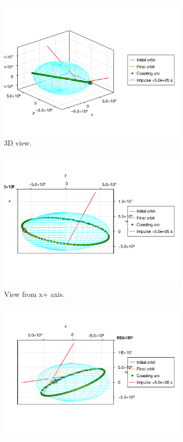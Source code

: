 \begin{figure}[htbp]
    \centering
    \begin{subfigure}{0.49\linewidth}
        \includegraphics[width=0.8\linewidth]{../results/two_body/ipv_noncop/CICIC_3d.png}
        \caption{3D view.}
    \end{subfigure}
    \begin{subfigure}{0.49\linewidth}
        \includegraphics[width=0.8\linewidth]{../results/two_body/ipv_noncop/CICIC_x+.png}
        \caption{View from x+ axis.}
    \end{subfigure}
    \begin{subfigure}{0.49\linewidth}
        \includegraphics[width=0.8\linewidth]{../results/two_body/ipv_noncop/CICIC_y+.png}

\end{subfigure}
\end{figure}
